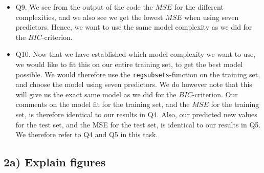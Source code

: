 \documentclass[]{article}
\begin{document}
\begin{itemize}
\item
  Q9. We see from the output of the code the \(MSE\) for the different
  complexities, and we also see we get the lowest \(MSE\) when using
  seven predictors. Hence, we want to use the same model complexity as
  we did for the \(BIC\)-criterion.
\item
  Q10. Now that we have established which model complexity we want to
  use, we would like to fit this on our entire training set, to get the
  best model possible. We would therefore use the
  \texttt{regsubsets}-function on the training set, and choose the model
  using seven predictors. We do however note that this will give us the
  exact same model as we did for the \(BIC\)-criterion. Our comments on
  the model fit for the training set, and the \(MSE\) for the training
  set, is therefore identical to our results in Q4. Also, our predicted
  new values for the test set, and the MSE for the test set, is
  identical to our results in Q5. We therefore refer to Q4 and Q5 in
  this task.
\end{itemize}

\subsection{2a) Explain figures}\label{a-explain-figures}
\end{document}
